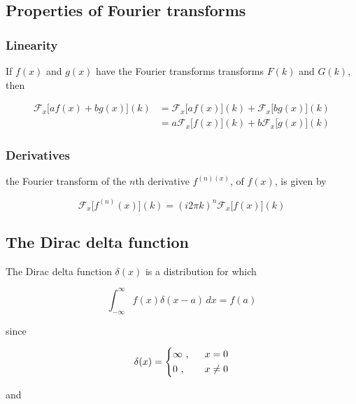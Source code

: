 \documentclass[a4paper]{article}
\begin{document}
\subsection{Properties of Fourier transforms}

\subsubsection*{Linearity}

If $f(x)$ and $g(x)$ have the Fourier transforms transforms $F(k)$ and $G(k)$, then

\begin{align*}
    \mathcal{F}_x\big[af(x)+bg(x)\big](k)&=\mathcal{F}_x\big[af(x)\big](k)+\mathcal{F}_x\big[bg(x)\big](k)\\[1em]
    &=a\mathcal{F}_x\big[f(x)\big](k)+b\mathcal{F}_x\big[g(x)\big](k)
\end{align*}

\subsubsection*{Derivatives}

the Fourier transform of the $n$th derivative $f^{(n)(x)}$, of $f(x)$, is given by

\begin{equation*}
    \mathcal{F}_x\big[f^{(n)}(x)\big](k)=(i2\pi k)^n\mathcal{F}_x\big[f(x)\big](k)
\end{equation*}

\subsection{The Dirac delta function}

The Dirac delta function $\delta(x)$ is a distribution for which

\begin{equation*}
    \int_{-\infty}^{\infty}f(x)\delta(x-a)\,dx=f(a)
\end{equation*}

since

\begin{equation*}
    \delta(x)
    =
    \begin{dcases}
        \infty\ ,\ \ &x=0 \\
        0\ ,\ \ &x\not=0 \\
    \end{dcases}
\end{equation*}

and
\end{document}
